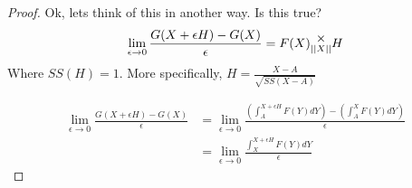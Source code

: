 \documentclass[12pt]{article}
\theoremstyle{definition}
\theoremstyle{plain}
\theoremstyle{ppart}
\newcommand{\mmult}[1]{\text{\raisebox{1ex}{$\underset{#1}{\times}$}}}
\begin{document}
\begin{landscape}
\begin{proof}
Ok, lets think of this in another way. Is this true?
\[
	\lim_{\epsilon \to 0}
	\frac{
		G(X+\epsilon H) - G(X)
	}{\epsilon}
	=
	F(X) \mmult{||X||} H
\]
Where $SS(H) = 1$. More specifically, $H = \frac{X-A}{\sqrt{SS(X-A)}}$

\begin{align*}
\lim_{\epsilon \to 0}
\frac{
	G(X+\epsilon H) - G(X)
}{\epsilon}
&= 
\lim_{\epsilon \to 0}
\frac{
	\left( \int_A^{X+\epsilon H} F(Y) dY \right) - \left( \int_A^X F(Y) dY \right)
}{\epsilon} \\
&= 
\lim_{\epsilon \to 0}
\frac{
	\int_X^{X+\epsilon H} F(Y) dY
}{\epsilon}
\end{align*}
\end{proof}
\end{landscape}



\end{document}
